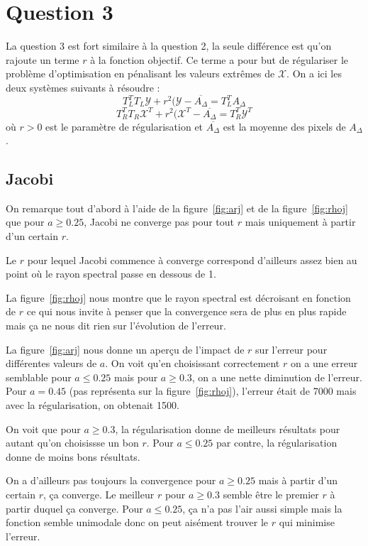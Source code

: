 \section{Question 3}
La question 3 est fort similaire à la question 2, la seule différence est qu'on rajoute un terme $r$ à la fonction objectif. Ce terme a pour but de régulariser le problème d'optimisation en pénalisant les valeurs extrêmes de $\mathcal{X}$. On a ici les deux systèmes suivants à résoudre : $$T_{L}^{T} T_L \mathcal{Y} + r^2 (\mathcal{Y}-\overline{A_{\Delta}} = T_{L}^{T} A_{\Delta}$$ $$T_{R}^{T} T_R \mathcal{X}^{T} + r^2 (\mathcal{X}^{T}-\overline{A_{\Delta}} = T_{R}^{T} \mathcal{Y}^{T}$$ où $r>0$ est le paramètre de régularisation et $\overline{A_{\Delta}}$ est la moyenne des pixels de $A_{\Delta}$.
\subsection{Jacobi}
On remarque tout d'abord à l'aide de la figure~\ref{fig:arj}
et de la figure~\ref{fig:rhoj} que pour $a \geq 0.25$,
Jacobi ne converge pas pour tout $r$ mais uniquement à partir
d'un certain $r$.

Le $r$ pour lequel Jacobi commence à converge correspond d'ailleurs
assez bien au point où le rayon spectral passe en dessous de 1.

La figure~\ref{fig:rhoj} nous montre que le rayon spectral est
décroisant en fonction de $r$ ce qui nous invite à penser que
la convergence sera de plus en plus rapide mais ça ne nous
dit rien sur l'évolution de l'erreur.

La figure~\ref{fig:arj} nous donne un aperçu de l'impact de $r$
sur l'erreur pour différentes valeurs de $a$.
On voit qu'en choisissant correctement $r$ on a une erreur semblable
pour $a \leq 0.25$ mais pour $a \geq 0.3$, on a une nette
diminution de l'erreur.
Pour $a = 0.45$ (pas représenta sur la figure~\ref{fig:rhoj}),
l'erreur était de 7000 mais avec la régularisation, on obtenait
1500.

On voit que pour $a \geq 0.3$, la régularisation donne de meilleurs résultats
pour autant qu'on choisissse un bon $r$.
Pour $a \leq 0.25$ par contre, la régularisation donne de moins bons résultats.

On a d'ailleurs pas toujours la convergence pour $a \geq 0.25$ mais à partir
d'un certain $r$, ça converge.
Le meilleur $r$ pour $a \geq 0.3$ semble être le premier $r$ à partir duquel
ça converge.
Pour $a \leq 0.25$, ça n'a pas l'air aussi simple mais la fonction semble
unimodale donc on peut aisément trouver le $r$ qui minimise l'erreur.

